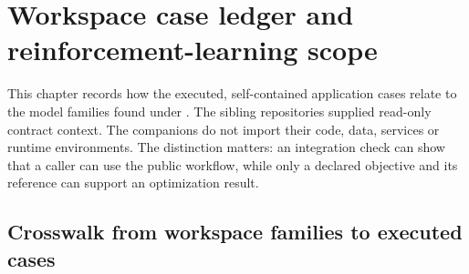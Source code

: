 \chapter{Workspace case ledger and reinforcement-learning scope}
\label{sec:workspace-cases}

This chapter records how the executed, self-contained application cases relate
to the model families found under . The sibling
repositories supplied read-only contract context. The companions do not import
their code, data, services or runtime environments. The distinction matters:
an integration check can show that a caller can use the public workflow, while
only a declared objective and its reference can support an optimization result.

\section{Crosswalk from workspace families to executed cases}

